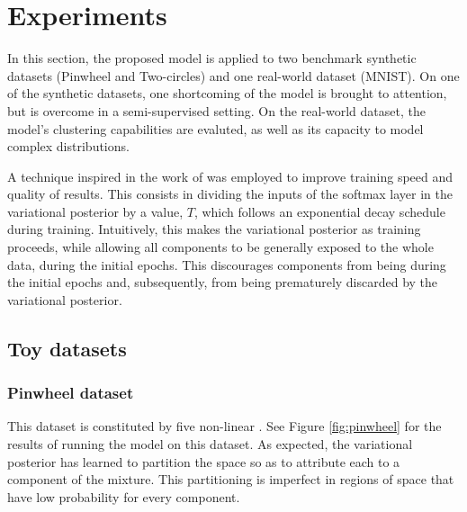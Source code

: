 \section{Experiments}
\label{section:experiments}

In this section, the proposed model is applied to two benchmark synthetic datasets (Pinwheel
and Two-circles) and one real-world dataset (MNIST). On one of the synthetic
datasets, one shortcoming of the model is brought to attention, but is overcome
in a semi-supervised setting. On the real-world dataset, the model's clustering
capabilities are evaluted, as well as its capacity to model complex distributions.

A technique inspired in the work of \textcite{mixae} was employed to improve training
speed and quality of results. This consists in dividing the inputs of the softmax layer in
the variational posterior by a  value, $T$, which follows
an exponential decay schedule during training. Intuitively, this makes the
variational posterior  as training proceeds, while allowing all
components to be generally exposed to the whole data, during the initial epochs.
This discourages components from being  during the initial epochs
and, subsequently, from being prematurely discarded by the variational posterior.

\subsection{Toy datasets}
\subsubsection{Pinwheel dataset}

This dataset is constituted by five non-linear . See Figure \ref{fig:pinwheel}
for the results of running the model on this dataset. As expected, the variational
posterior has learned to partition the space so as to attribute each  to
a component of the mixture. This partitioning is imperfect in regions of space
that have low probability for every component.

